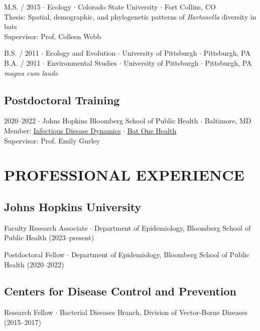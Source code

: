 \documentclass{cv}
\begin{document}
M.S. / 2015 $\cdot$ Ecology $\cdot$ Colorado State University $\cdot$ Fort Collins, CO \\
Thesis: Spatial, demographic, and phylogenetic patterns of \textit{Bartonella} diversity in bats \\
Supervisor: Prof. Colleen Webb

B.S. / 2011 $\cdot$ Ecology and Evolution $\cdot$ University of Pittsburgh $\cdot$ Pittsburgh, PA \\
B.A. / 2011 $\cdot$ Environmental Studies $\cdot$ University of Pittsburgh $\cdot$ Pittsburgh, PA \\
\textit{magna cum laude}

\subsection*{Postdoctoral Training}

2020--2022 $\cdot$ Johns Hopkins Bloomberg School of Public Health $\cdot$ Baltimore, MD \\
Member: \href{http://www.iddynamics.jhsph.edu/}{Infectious Disease Dynamics} $\cdot$ \href{https://batonehealth.org/}{Bat One Health} \\
Supervisor: Prof. Emily Gurley


\section*{PROFESSIONAL EXPERIENCE}

\subsection*{Johns Hopkins University}

Faculty Research Associate $\cdot$ Department of Epidemiology, Bloomberg School of Public Health (2023--present)

Postdoctoral Fellow $\cdot$ Department of Epidemiology, Bloomberg School of Public Health (2020--2022)

\subsection*{Centers for Disease Control and Prevention}

Research Fellow $\cdot$ Bacterial Diseases Branch, Division of Vector-Borne Diseases (2015--2017)
\end{document}
